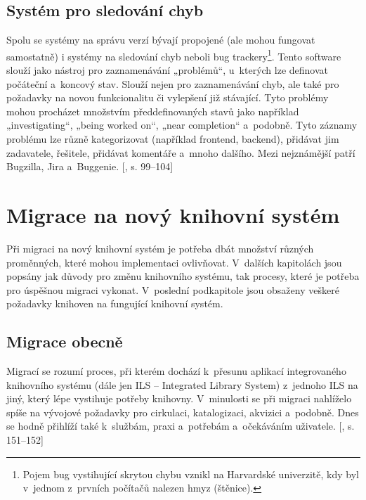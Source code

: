 \documentclass[
	11pt, oneside, printed, final, palatino
	microtype,
	table,   %
	lof,     %
	lot     %
]{fithesis3}
\newcommand{\citepages}[2]{[\cite{#2}, s. #1]}
\begin{document}
{\subsection{Systém pro sledování chyb}
Spolu se systémy na správu verzí bývají propojené (ale mohou fungovat samostatně) i systémy na sledování chyb neboli bug trackery\footnote{Pojem bug vystihující skrytou chybu vznikl na Harvardské univerzitě, kdy byl v~jednom z~prvních počítačů nalezen hmyz (štěnice).}. Tento software slouží jako nástroj pro zaznamenávání „problémů“, u~kterých lze definovat počáteční a~koncový stav. Slouží nejen pro zaznamenávání chyb, ale také pro požadavky na novou funkcionalitu či vylepšení již stávající. Tyto problémy mohou procházet množstvím předdefinovaných stavů jako například „investigating“, „being worked on“, „near completion“ a~podobně. Tyto záznamy problému lze různě kategorizovat (například frontend, backend), přidávat jim zadavatele, řešitele, přidávat komentáře a~mnoho dalšího. Mezi nejznámější patří Bugzilla, Jira a~Buggenie. \citepages{99–104}{Fogel2012}

\section{Migrace na nový knihovní systém}

Při migraci na nový knihovní systém je potřeba dbát množství různých proměnných, které mohou implementaci ovlivňovat. V~dalších kapitolách jsou popsány jak důvody pro změnu knihovního systému, tak procesy, které je potřeba pro úspěšnou migraci vykonat. V~poslední podkapitole jsou obsaženy veškeré požadavky knihoven na fungující knihovní systém.  

\subsection{Migrace obecně}

Migrací se rozumí proces, při kterém dochází k~přesunu aplikací integrovaného knihovního systému (dále jen ILS – Integrated Library System) z~jednoho ILS na jiný, který lépe vystihuje potřeby knihovny. V~minulosti se při migraci nahlíželo spíše na vývojové požadavky pro cirkulaci, katalogizaci, akvizici a~podobně. Dnes se hodně přihlíží také k~službám, praxi a~potřebám a~očekáváním uživatele. \citepages{151–152}{bilal_2014}

}
\end{document}
